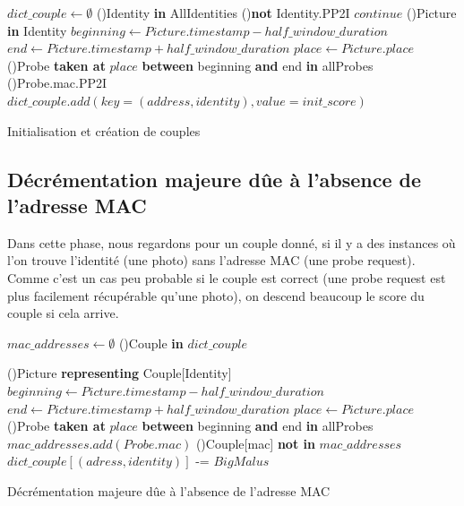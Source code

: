 \begin{algorithm2e}[H]
	\SetAlgoLined
	$dict\_couple  \gets \emptyset $\;
	\ForEach(){Identity \textbf{in} AllIdentities}{
		\If(){\textbf{not} Identity.PP2I}{
			$continue$
		}
		 \ForEach(){Picture \textbf{in} Identity}{
			 $beginning \gets Picture.timestamp - half\_window\_duration$\;
			 $end \gets Picture.timestamp + half\_window\_duration$\;
			 $place \gets Picture.place$\;
			 \ForEach(){Probe \textbf{taken at} $place$ \textbf{between} beginning \textbf{and} end \textbf{in} allProbes}{
				\If(){Probe.mac.PP2I}{
			 		$dict\_couple.add(key=(address, identity), value=init\_score)$
			 	}
			}
		}
	}
	\caption{Initialisation et création de couples}
\end{algorithm2e}

\subsection{Décrémentation majeure dûe à l'absence de l'adresse MAC}
Dans cette phase, nous regardons pour un couple donné, si il y a des instances où l'on trouve 
l'identité (une photo) sans l'adresse MAC (une probe request). Comme c'est un cas peu probable si le couple
est correct (une probe request est plus facilement récupérable qu'une photo), on descend beaucoup le score du couple si cela arrive.

\begin{algorithm2e}[H]
	\SetAlgoLined
	$mac\_addresses  \gets \emptyset $\;
	\ForEach(){Couple \textbf{in} $dict\_couple$}{
		 \ForEach(){Picture \textbf{representing} Couple[Identity]}{
			$beginning \gets Picture.timestamp - half\_window\_duration$\;
			$end \gets Picture.timestamp + half\_window\_duration$\;
			$place \gets Picture.place$\; 
			\ForEach(){Probe \textbf{taken at} $place$ \textbf{between} beginning \textbf{and} end \textbf{in} allProbes}{
				$mac\_addresses.add(Probe.mac)$
			 }
			}
		\If(){Couple[mac] \textbf{not in} $mac\_addresses$}{
			$dict\_couple[(adress, identity)]$ -= $BigMalus$\;
		}

		}
	\caption{Décrémentation majeure dûe à l'absence de l'adresse MAC}
\end{algorithm2e}


